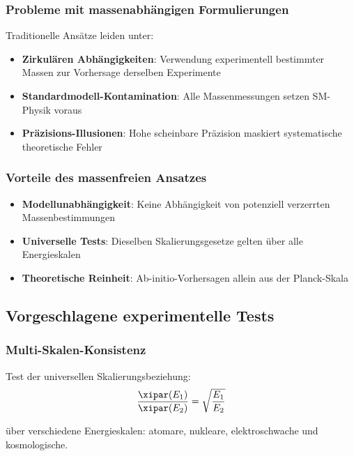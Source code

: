 	\subsubsection{Probleme mit massenabhängigen Formulierungen}
	
	Traditionelle Ansätze leiden unter:
	\begin{itemize}
		\item \textbf{Zirkulären Abhängigkeiten}: Verwendung experimentell bestimmter Massen zur Vorhersage derselben Experimente
		\item \textbf{Standardmodell-Kontamination}: Alle Massenmessungen setzen SM-Physik voraus
		\item \textbf{Präzisions-Illusionen}: Hohe scheinbare Präzision maskiert systematische theoretische Fehler
	\end{itemize}
	
	\subsubsection{Vorteile des massenfreien Ansatzes}
	
	\begin{itemize}
		\item \textbf{Modellunabhängigkeit}: Keine Abhängigkeit von potenziell verzerrten Massenbestimmungen
		\item \textbf{Universelle Tests}: Dieselben Skalierungsgesetze gelten über alle Energieskalen
		\item \textbf{Theoretische Reinheit}: Ab-initio-Vorhersagen allein aus der Planck-Skala
	\end{itemize}
	
	\subsection{Vorgeschlagene experimentelle Tests}
	\label{subsec:experimental_tests}
	
	\subsubsection{Multi-Skalen-Konsistenz}
	
	Test der universellen Skalierungsbeziehung:
	\begin{equation}
		\frac{\xipar(E_1)}{\xipar(E_2)} = \sqrt{\frac{E_1}{E_2}}
		\label{eq:scaling_test}
	\end{equation}
	
	über verschiedene Energieskalen: atomare, nukleare, elektroschwache und kosmologische.
	
